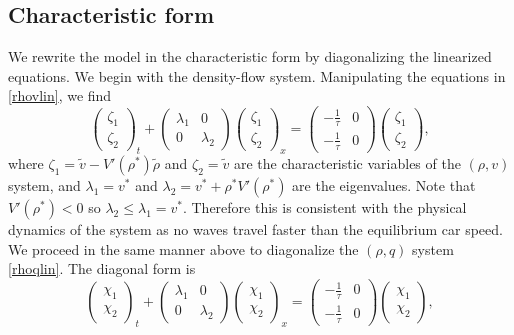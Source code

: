 \documentclass[preprint]{elsarticle}
\begin{document}
\subsection{Characteristic form}
We rewrite the model in the characteristic form by diagonalizing the linearized equations. 
We begin with the density-flow system. Manipulating the equations in \eqref{rhovlin}, we find
\begin{equation}
\begin{pmatrix}
\zeta_1 \\ \zeta_2
\end{pmatrix}_t
+ \begin{pmatrix}
\lambda_1 & 0 \\
0 & \lambda_2 
\end{pmatrix}
\begin{pmatrix}
\zeta_1 \\ \zeta_2
\end{pmatrix}_x
= \begin{pmatrix}
-\frac{1}{\tau} & 0 \\
-\frac{1}{\tau} & 0
\end{pmatrix}
\begin{pmatrix}
\zeta_1 \\ \zeta_2
\end{pmatrix},
\end{equation}
where $\zeta_1 = \tilde{v} - V'( \rho^* )\tilde{\rho}$ and $\zeta_2 = \tilde{v}$ are the characteristic variables of the $(\rho, v)$ system, and $\lambda_1 = v^*$ and $\lambda_2 = v^* + \rho^* V'( \rho^*)$ are the eigenvalues. Note that $V'( \rho^*) < 0$ so $\lambda_2 \leq \lambda_1 = v^*$. Therefore this is consistent with the physical dynamics of the system as no waves travel faster than the equilibrium car speed. \\
We proceed in the same manner above to diagonalize the $(\rho,q)$ system \eqref{rhoqlin}. The diagonal form is
\begin{equation} \label{rhoqlindiag}
\begin{pmatrix}
\chi_1 \\ \chi_2
\end{pmatrix}_t 
+ \begin{pmatrix}
\lambda_1 & 0 \\
0 & \lambda_2
\end{pmatrix}
\begin{pmatrix}
\chi_1 \\ \chi_2
\end{pmatrix}_x
= \begin{pmatrix}
-\frac{1}{\tau} & 0 \\
-\frac{1}{\tau} & 0
\end{pmatrix}
\begin{pmatrix}
\chi_1 \\ \chi_2
\end{pmatrix},
\end{equation}
\end{document}
